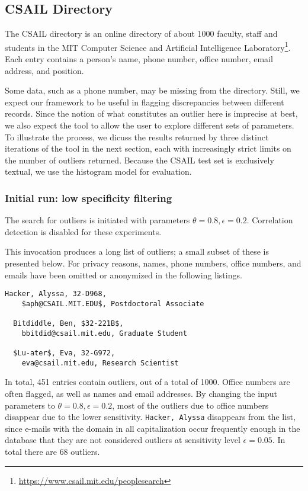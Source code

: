 \subsection{CSAIL Directory}
\label{sec:csail-directory-evaluation}

The CSAIL directory is an online directory of about 1000 faculty, staff and students in the MIT Computer Science and Artificial Intelligence Laboratory\footnote{\url{https://www.csail.mit.edu/peoplesearch}}. Each entry contains a person's name, phone number, office number, email address, and position.

Some data, such as a phone number, may be missing from the directory. Still, we expect our framework to be useful in flagging discrepancies between different records. Since the notion of what constitutes an outlier here is imprecise at best, we also expect the tool to allow the user to explore different sets of parameters. To illustrate the process, we dicuss the results returned by three distinct iterations of the tool in the next section, each with increasingly strict limits on the number of outliers returned. Because the CSAIL test set is exclusively textual, we use the histogram model for evaluation.

\subsubsection{Initial run: low specificity filtering}
The search for outliers is initiated with parameters $\theta = 0.8, \epsilon = 0.2$. Correlation detection is disabled for these experiments.

This invocation produces a long list of outliers; a small subset of these is presented below. For privacy reasons, names,  phone numbers, office numbers, and emails have been omitted or anonymized in the following listings.

\begin{lstlisting}[gobble=2]
  Hacker, Alyssa, 32-D968, 
    $aph@CSAIL.MIT.EDU$, Postdoctoral Associate

  Bitdiddle, Ben, $32-221B$,
    bbitdid@csail.mit.edu, Graduate Student

  $Lu-ater$, Eva, 32-G972, 
    eva@csail.mit.edu, Research Scientist
\end{lstlisting}

In total, 451 entries contain outliers, out of a total of 1000. Office numbers are often flagged, as well as names and email addresses. By changing the input parameters to $\theta = 0.8, \epsilon = 0.2$, most of the outliers due to office numbers disappear due to the lower sensitivity. \lstinline{Hacker, Alyssa} disappears from the list, since e-mails with the domain in all capitalization occur frequently enough in the database that they are not considered outliers at sensitivity level $\epsilon = 0.05$. In total there are $68$ outliers.


